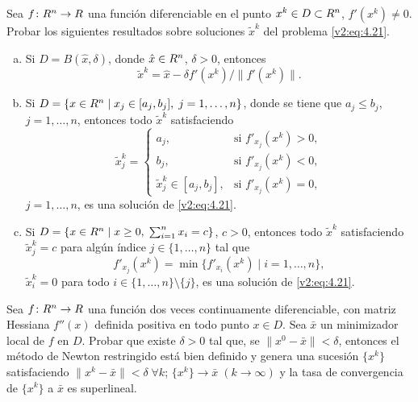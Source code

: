 \begin{exercise}\label{v2:ejer:4.1.11}
    Sea $f \colon R^n \to R$ una función diferenciable en el punto $x^k \in D \subset R^n$, $f'(x^k) \neq 0$. Probar los siguientes resultados sobre soluciones $\tilde{x}^k$ del problema \eqref{v2:eq:4.21}.
    \begin{enumerate}[(a)]
        \item Si $D = B(\hat{x}, \delta)$, donde $\hat{x} \in R^n$, $\delta > 0$, entonces
        \[
            \tilde{x}^k = \hat{x} - \delta f'(x^k)/\|f'(x^k)\|.
        \]
        \item Si $D = \{x \in R^n \mid x_j \in [a_j, b_j], \; j = 1, \dots, n\}$, donde se tiene que $a_j \le b_j$, $j = 1, \dots, n$, entonces todo $\tilde{x}^k$ satisfaciendo
        \[
            \tilde{x}^k_j = \begin{cases}
                a_j, & \text{si } f'_{x_j}(x^k) > 0, \\
                b_j, & \text{si } f'_{x_j}(x^k) < 0, \\
                \tilde{x}^k_j \in [a_j, b_j], & \text{si } f'_{x_j}(x^k) = 0,
            \end{cases}
        \]
        $j = 1, \dots, n$, es una solución de \eqref{v2:eq:4.21}.
        \item Si $D = \{x \in R^n \mid x \ge 0, \; \sum_{i=1}^n x_i = c\}$, $c > 0$, entonces todo $\tilde{x}^k$ satisfaciendo $\tilde{x}^k_j = c$ para algún índice $j \in \{1, \dots, n\}$ tal que
        \[
            f'_{x_j}(x^k) = \min \{f'_{x_i}(x^k) \mid i = 1, \dots, n\},
        \]
        $\tilde{x}^k_i = 0$ para todo $i \in \{1, \dots, n\} \setminus \{j\}$, es una solución de \eqref{v2:eq:4.21}.
    \end{enumerate}
\end{exercise}

\begin{exercise}\label{v2:ejer:4.1.12}
    Sea $f \colon R^n \to R$ una función dos veces continuamente diferenciable, con matriz Hessiana $f''(x)$ definida positiva en todo punto $x \in D$. Sea $\bar{x}$ un minimizador local de $f$ en $D$.
    Probar que existe $\delta > 0$ tal que, se $\|x^0 - \bar{x}\| < \delta$, entonces el método de Newton restringido está bien definido y genera una sucesión $\{x^k\}$ satisfaciendo $\|x^k - \bar{x}\| < \delta \; \forall k$; $\{x^k\} \to \bar{x} \; (k \to \infty)$ y la tasa de convergencia de $\{x^k\}$ a $\bar{x}$ es superlineal.
\end{exercise}

